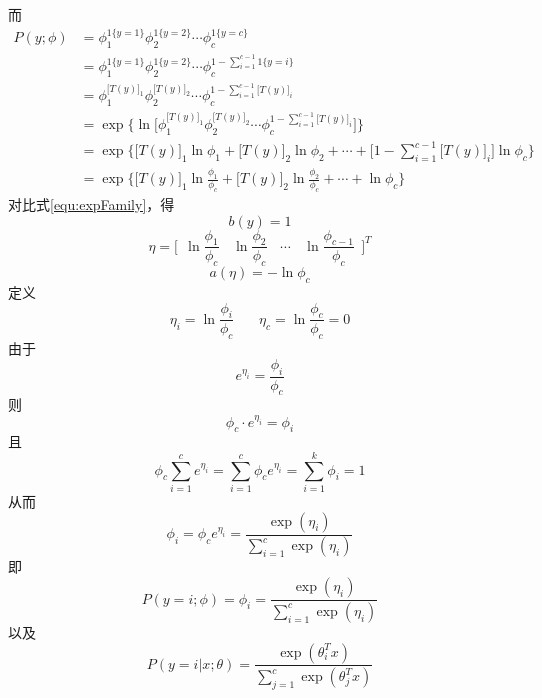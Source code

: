 而
\begin{equation}
\begin{split}
P(y; \phi) &= \phi_1^{1\{y=1\}} \phi_2^{1\{y=2\}}\cdots\phi_c^{1\{y=c\}} \\
&=\phi_1^{1\{y=1\}} \phi_2^{1\{y=2\}}\cdots\phi_c^{1 - \sum\limits_{i=1}^{c - 1}1\{y = i\}} \\
&=\phi_1^{\big[T(y)\big]_1}\phi_2^{\big[T(y)\big]_2}\cdots\phi_c^{1 - \sum\limits_{i=1}^{c-1}\big[T(y)\big]_i}\\
&=\exp\bigg\{\ln\Big[\phi_1^{\big[T(y)\big]_1}\phi_2^{\big[T(y)\big]_2}\cdots\phi_c^{1 - \sum\limits_{i=1}^{c-1}\big[T(y)\big]_i}\Big]\bigg\} \\
&=\exp\bigg\{ \Big[T(y)\Big]_1\ln\phi_1 + \Big[T(y)\Big]_2\ln\phi_2+\cdots + \bigg[1-\sum\limits_{i=1}^{c-1}\Big[T(y)\Big]_i \bigg]\ln\phi_c \bigg\}\\
&=\exp\bigg\{\Big[T(y)\Big]_1\ln\frac{\phi_1}{\phi_c} + \Big[T(y)\Big]_2\ln\frac{\phi_2}{\phi_c} + \cdots  +  \ln \phi_c \bigg\}
\end{split}
\end{equation}
对比式\eqref{equ:expFamily}，得
\begin{equation}
b(y) = 1
\end{equation}
\begin{equation}
\eta = \Big[~~\ln\frac{\phi_1}{\phi_c}~~~~\ln\frac{\phi_2}{\phi_c}~~~~\cdots~~~~\ln\frac{\phi_{c-1}}{\phi_c}~~\Big]^T
\end{equation}
\begin{equation}
a(\eta) = -\ln\phi_c
\end{equation}
定义
\begin{equation}
\eta_i = \ln\frac{\phi_i}{\phi_c}~~~~~~~~\eta_c = \ln \frac{\phi_c}{\phi_c}=0
\end{equation}
由于
\begin{equation}
e^{\eta_i} = \frac{\phi_i}{\phi_c}
\end{equation}
则
\begin{equation}
\phi_c\cdot e^{\eta_i} = \phi_i
\end{equation}
且
\begin{equation}
\phi_c\sum\limits_{i=1}^c e^{\eta_i}= \sum\limits_{i=1}^c \phi_c e^{\eta_i}
=\sum\limits_{i=1}^k\phi_i
=1
\end{equation}
从而
\begin{equation}
\phi_i = \phi_c e^{\eta_i} = \frac{\exp(\eta_i)}{\sum_{i=1}^c \exp(\eta_i)}
\end{equation}
即
\begin{equation}
P(y=i;\phi) = \phi_i =\frac{\exp(\eta_i)}{\sum_{i=1}^c \exp(\eta_i)}
\end{equation}
以及
\begin{equation}
P(y=i|x;\theta) = \frac{\exp(\theta_i^Tx)}{\sum_{j=1}^c\exp(\theta_j^T x)}
\end{equation}

